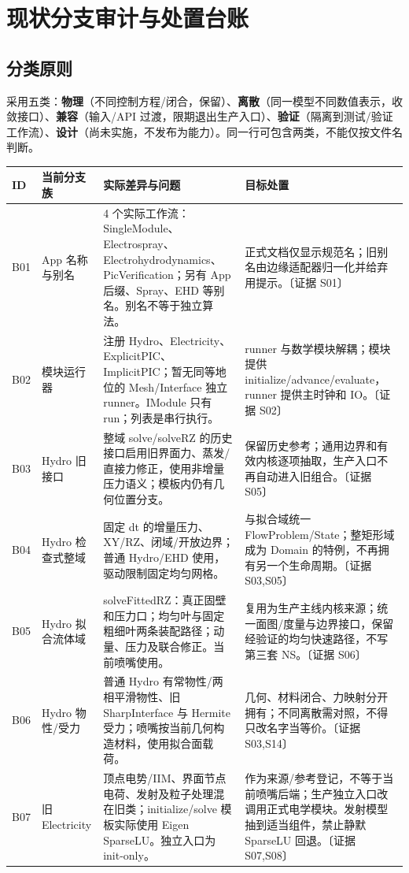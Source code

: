 \documentclass[UTF8,a4paper,11pt,fontset=fandol]{ctexart}
\numberwithin{equation}{section}
\newcommand{\ev}[1]{\textcolor{accent}{〔证据 #1〕}}
\begin{document}
\section{现状分支审计与处置台账}\label{sec:audit}
\subsection{分类原则}
采用五类：\textbf{物理}（不同控制方程/闭合，保留）、\textbf{离散}（同一模型不同数值表示，收敛接口）、\textbf{兼容}（输入/API 过渡，限期退出生产入口）、\textbf{验证}（隔离到测试/验证工作流）、\textbf{设计}（尚未实施，不发布为能力）。同一行可包含两类，不能仅按文件名判断。

\small
\begin{longtable}{@{}P{.06\textwidth}P{.23\textwidth}P{.33\textwidth}P{.30\textwidth}@{}}
\toprule ID & 当前分支族 & 实际差异与问题 & 目标处置\\\midrule\endhead
B01 & App 名称与别名 & 4 个实际工作流：SingleModule、Electrospray、Electrohydrodynamics、PicVerification；另有 App 后缀、Spray、EHD 等别名。别名不等于独立算法。 & 正式文档仅显示规范名；旧别名由边缘适配器归一化并给弃用提示。\ev{S01}\\
B02 & 模块运行器 & 注册 Hydro、Electricity、ExplicitPIC、ImplicitPIC；暂无同等地位的 Mesh/Interface 独立 runner。IModule 只有 run；列表是串行执行。 & runner 与数学模块解耦；模块提供 initialize/advance/evaluate，runner 提供主时钟和 IO。\ev{S02}\\
B03 & Hydro 旧接口 & 整域 solve/solveRZ 的历史接口启用旧界面力、蒸发/直接力修正，使用非增量压力语义；模板内仍有几何位置分支。 & 保留历史参考；通用边界和有效内核逐项抽取，生产入口不再自动进入旧组合。\ev{S05}\\
B04 & Hydro 检查式整域 & 固定 dt 的增量压力、XY/RZ、闭域/开放边界；普通 Hydro/EHD 使用，驱动限制固定均匀网格。 & 与拟合域统一 FlowProblem/State；整矩形域成为 Domain 的特例，不再拥有另一个生命周期。\ev{S03,S05}\\
B05 & Hydro 拟合流体域 & solveFittedRZ：真正固壁和压力口；均匀叶与固定粗细叶两条装配路径；动量、压力及联合修正。当前喷嘴使用。 & 复用为生产主线内核来源；统一面图/度量与边界接口，保留经验证的均匀快速路径，不写第三套 NS。\ev{S06}\\
B06 & Hydro 物性/受力 & 普通 Hydro 有常物性/两相平滑物性、旧 SharpInterface 与 Hermite 受力；喷嘴按当前几何构造材料，使用拟合面载荷。 & 几何、材料闭合、力映射分开拥有；不同离散需对照，不得只改名字当等价。\ev{S03,S14}\\
B07 & 旧 Electricity & 顶点电势/IIM、界面节点电荷、发射及粒子处理混在旧类；initialize/solve 模板实际使用 Eigen SparseLU。独立入口为 init-only。 & 作为来源/参考登记，不等于当前喷嘴后端；生产独立入口改调用正式电学模块。发射模型抽到适当组件，禁止静默 SparseLU 回退。\ev{S07,S08}\\

\end{longtable}
\end{document}
